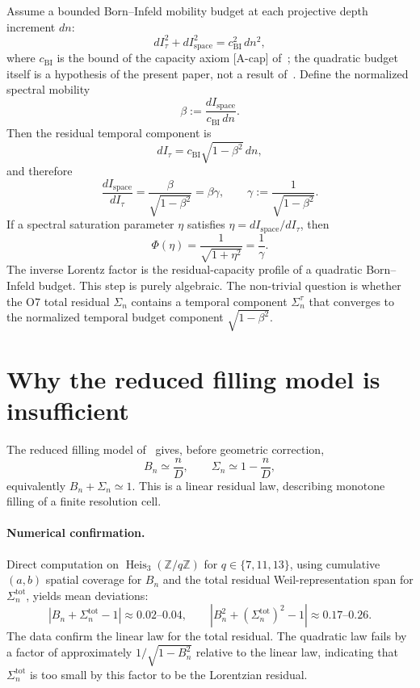 \documentclass[11pt]{article}
\begin{document}
    Assume a bounded Born--Infeld mobility budget at each projective depth
    increment $dn$:
    \[
      dI_\tau^2 + dI_{\mathrm{space}}^2 = c_{\mathrm{BI}}^2\,dn^2,
    \]
    where $c_{\mathrm{BI}}$ is the bound of the capacity axiom [A-cap] of~\cite{Beau2026c};
    the quadratic budget itself is a hypothesis of the present paper, not a result
    of~\cite{Beau2026c}.
    Define the normalized spectral mobility
    \[
      \beta := \frac{dI_{\mathrm{space}}}{c_{\mathrm{BI}}\,dn}.
    \]
    Then the residual temporal component is
    \[
      dI_\tau = c_{\mathrm{BI}}\sqrt{1-\beta^2}\,dn,
    \]
    and therefore
    \[
      \frac{dI_{\mathrm{space}}}{dI_\tau}
      =
      \frac{\beta}{\sqrt{1-\beta^2}}
      =
      \beta\gamma,
      \qquad
      \gamma := \frac{1}{\sqrt{1-\beta^2}}.
    \]
    If a spectral saturation parameter $\eta$ satisfies $\eta = dI_{\mathrm{space}}/dI_\tau$, then
    \[
      \Phi(\eta) = \frac{1}{\sqrt{1+\eta^2}} = \frac{1}{\gamma}.
    \]
    The inverse Lorentz factor is the residual-capacity profile of a quadratic
    Born--Infeld budget.
    This step is purely algebraic.
    The non-trivial question is whether the O7 total residual $\Sigma_n$ contains
    a temporal component $\Sigma_n^\tau$ that converges to the normalized temporal
    budget component $\sqrt{1-\beta^2}$.

  \section{Why the reduced filling model is insufficient}
    \label{sec:linear}

    The reduced filling model of~\cite{Beau2026a11} gives, before geometric correction,
    \[
      B_n \simeq \frac{n}{D},
      \qquad
      \Sigma_n \simeq 1 - \frac{n}{D},
    \]
    equivalently $B_n + \Sigma_n \simeq 1$.
    This is a linear residual law, describing monotone filling of a finite
    resolution cell.

    \paragraph{Numerical confirmation.}
      Direct computation on $\operatorname{Heis}_3(\mathbb{Z}/q\mathbb{Z})$ for
      $q \in \{7, 11, 13\}$, using cumulative $(a,b)$ spatial coverage for $B_n$ and
      the total residual Weil-representation span for $\Sigma_n^{\mathrm{tot}}$,
      yields mean deviations:
      \[
        |B_n + \Sigma_n^{\mathrm{tot}} - 1| \approx 0.02\text{--}0.04,
        \qquad
        |B_n^2 + (\Sigma_n^{\mathrm{tot}})^2 - 1| \approx 0.17\text{--}0.26.
      \]
      The data confirm the linear law for the total residual.
      The quadratic law fails by a factor of approximately $1/\sqrt{1-B_n^2}$ relative
      to the linear law, indicating that $\Sigma_n^{\mathrm{tot}}$ is too small by this
      factor to be the Lorentzian residual.
\end{document}
